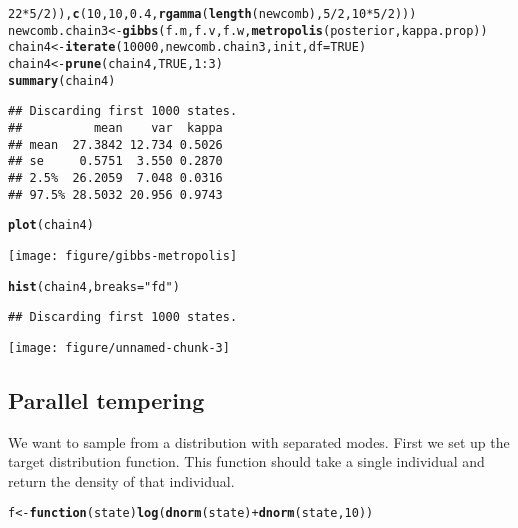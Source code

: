 \documentclass{article}\usepackage[]{graphicx}\usepackage[]{color}
\makeatletter
\def\maxwidth{ %
  \ifdim\Gin@nat@width>\linewidth
    \linewidth
  \else
    \Gin@nat@width
  \fi
}
\newcommand{\hlnum}[1]{\textcolor[rgb]{0.686,0.059,0.569}{#1}}%
\newcommand{\hlstr}[1]{\textcolor[rgb]{0.192,0.494,0.8}{#1}}%
\newcommand{\hlopt}[1]{\textcolor[rgb]{0,0,0}{#1}}%
\newcommand{\hlstd}[1]{\textcolor[rgb]{0.345,0.345,0.345}{#1}}%
\newcommand{\hlkwa}[1]{\textcolor[rgb]{0.161,0.373,0.58}{\textbf{#1}}}%
\newcommand{\hlkwb}[1]{\textcolor[rgb]{0.69,0.353,0.396}{#1}}%
\newcommand{\hlkwc}[1]{\textcolor[rgb]{0.333,0.667,0.333}{#1}}%
\newcommand{\hlkwd}[1]{\textcolor[rgb]{0.737,0.353,0.396}{\textbf{#1}}}%
\newenvironment{kframe}{%
 \def\at@end@of@kframe{}%
 \ifinner\ifhmode%
  \def\at@end@of@kframe{\end{minipage}}%
  \begin{minipage}{\columnwidth}%
 \fi\fi%
 \def\FrameCommand##1{\hskip\@totalleftmargin \hskip-\fboxsep
 \colorbox{shadecolor}{##1}\hskip-\fboxsep
     \hskip-\linewidth \hskip-\@totalleftmargin \hskip\columnwidth}%
 \MakeFramed {\advance\hsize-\width
   \@totalleftmargin\z@ \linewidth\hsize
   \@setminipage}}%
 {\par\unskip\endMakeFramed%
 \at@end@of@kframe}
\newenvironment{knitrout}{}{} %
\makeatother
\begin{document}
\begin{knitrout}
\begin{kframe}
\begin{alltt}
    \hlnum{22} \hlopt{*} \hlnum{5}\hlopt{/}\hlnum{2}\hlstd{)),} \hlkwd{c}\hlstd{(}\hlnum{10}\hlstd{,} \hlnum{10}\hlstd{,} \hlnum{0.4}\hlstd{,} \hlkwd{rgamma}\hlstd{(}\hlkwd{length}\hlstd{(newcomb),} \hlnum{5}\hlopt{/}\hlnum{2}\hlstd{,} \hlnum{10} \hlopt{*} \hlnum{5}\hlopt{/}\hlnum{2}\hlstd{)))}
\hlstd{newcomb.chain3} \hlkwb{<-} \hlkwd{gibbs}\hlstd{(f.m, f.v, f.w,} \hlkwd{metropolis}\hlstd{(posterior, kappa.prop))}
\hlstd{chain4} \hlkwb{<-} \hlkwd{iterate}\hlstd{(}\hlnum{10000}\hlstd{, newcomb.chain3, init,} \hlkwc{df} \hlstd{=} \hlnum{TRUE}\hlstd{)}
\hlstd{chain4} \hlkwb{<-} \hlkwd{prune}\hlstd{(chain4,} \hlnum{TRUE}\hlstd{,} \hlnum{1}\hlopt{:}\hlnum{3}\hlstd{)}
\hlkwd{summary}\hlstd{(chain4)}
\end{alltt}
\begin{verbatim}
## Discarding first 1000 states.
##          mean    var  kappa
## mean  27.3842 12.734 0.5026
## se     0.5751  3.550 0.2870
## 2.5%  26.2059  7.048 0.0316
## 97.5% 28.5032 20.956 0.9743
\end{verbatim}
\begin{alltt}
\hlkwd{plot}\hlstd{(chain4)}
\end{alltt}
\end{kframe}
\texttt{[image: figure/gibbs-metropolis]} 

\end{knitrout}

\begin{knitrout}
\color{fgcolor}\begin{kframe}
\begin{alltt}
\hlkwd{hist}\hlstd{(chain4,} \hlkwc{breaks} \hlstd{=} \hlstr{"fd"}\hlstd{)}
\end{alltt}
\begin{verbatim}
## Discarding first 1000 states.
\end{verbatim}
\end{kframe}
\texttt{[image: figure/unnamed-chunk-3]} 

\end{knitrout}


\subsection{Parallel tempering}
We want to sample from a distribution with separated modes.  First we
set up the target distribution function. This function should take a
single individual and return the density of that individual.
\begin{knitrout}
\color{fgcolor}\begin{kframe}
\begin{alltt}
\hlstd{f} \hlkwb{<-} \hlkwa{function}\hlstd{(}\hlkwc{state}\hlstd{)} \hlkwd{log}\hlstd{(}\hlkwd{dnorm}\hlstd{(state)} \hlopt{+} \hlkwd{dnorm}\hlstd{(state,} \hlnum{10}\hlstd{))}
\end{alltt}
\end{kframe}
\end{knitrout}
\end{document}
